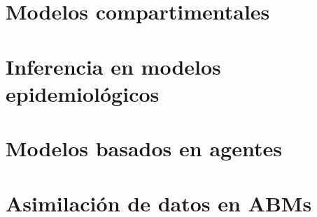 \section{Modelos compartimentales}
\section{Inferencia en modelos epidemiológicos}
\section{Modelos basados en agentes}
\section{Asimilación de datos en ABMs}

